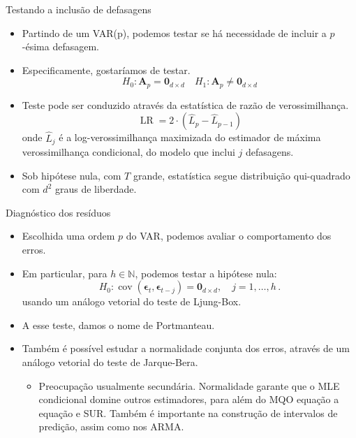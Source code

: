 \documentclass[11pt]{beamer}
\begin{document}
\begin{frame}{Testando a inclusão de defasagens}
\begin{itemize}
	\item Partindo de um VAR(p), podemos testar se há necessidade de incluir a $p$-ésima defasagem.
	\item Especificamente, gostaríamos de testar.
	\begin{equation}
		H_0: \boldsymbol{A}_p = \boldsymbol{0}_{d \times d} \quad H_1:  \boldsymbol{A}_p \neq \boldsymbol{0}_{d \times d}
	\end{equation} 
	\item Teste pode ser conduzido através da estatística de razão de verossimilhança.
	\begin{equation}
		\operatorname{LR} = 2\cdot(\hat{L}_{p} - \hat{L}_{p-1})
	\end{equation}
	onde $\hat{L}_j$ é a log-verossimilhança maximizada do estimador de máxima verossimilhança condicional, do modelo que inclui $j$ defasagens.
	\item Sob hipótese nula, com $T$ grande, estatística segue distribuição qui-quadrado com $d^2$ graus de liberdade.
\end{itemize}
\end{frame}

\begin{frame}{Diagnóstico dos resíduos}
	\begin{itemize}
		\item Escolhida uma ordem $p$ do VAR, podemos avaliar o comportamento dos erros.
		\item Em particular, para $h \in \mathbb{N}$, podemos testar a hipótese nula:
		$$H_0: \operatorname{cov}(\boldsymbol{\epsilon}_{t}, \boldsymbol{\epsilon}_{t-j}) = \boldsymbol{0}_{d\times d}, \quad j=1,\ldots, h\, .$$
		usando um análogo vetorial do teste de Ljung-Box.
		\item A esse teste, damos o nome de {\color{blue}Portmanteau}.
		\item Também é possível estudar a normalidade conjunta dos erros, através de um análogo vetorial do teste de Jarque-Bera.
		\begin{itemize}
			\item Preocupação usualmente secundária. Normalidade garante que o MLE condicional domine outros estimadores, para além do MQO equação a equação e SUR. Também é importante na construção de intervalos de predição, assim como nos ARMA.
		\end{itemize}
	\end{itemize}
\end{frame}
\end{document}
